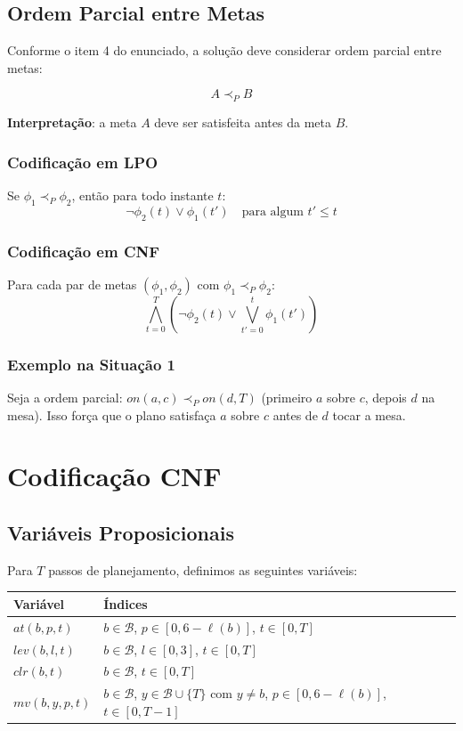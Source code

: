 \documentclass[12pt,a4paper]{article}
\begin{document}
\subsection{Ordem Parcial entre Metas}

Conforme o item 4 do enunciado, a solução deve considerar ordem parcial entre metas:

\[
A \prec_P B
\]

\textbf{Interpretação}: a meta $A$ deve ser satisfeita antes da meta $B$.

\subsubsection{Codificação em LPO}

Se $\phi_1 \prec_P \phi_2$, então para todo instante $t$:
\[
\neg \phi_2(t) \vee \phi_1(t') \quad \text{para algum } t' \le t
\]

\subsubsection{Codificação em CNF}

Para cada par de metas $(\phi_1, \phi_2)$ com $\phi_1 \prec_P \phi_2$:
\[
\bigwedge_{t=0}^{T} \left( \neg \phi_2(t) \vee \bigvee_{t'=0}^{t} \phi_1(t') \right)
\]

\subsubsection{Exemplo na Situação 1}

Seja a ordem parcial: $on(a,c) \prec_P on(d,T)$ (primeiro $a$ sobre $c$, depois $d$ na mesa). Isso força que o plano satisfaça $a$ sobre $c$ antes de $d$ tocar a mesa.

\section{Codificação CNF}
\label{sec:cnf}

\subsection{Variáveis Proposicionais}

Para $T$ passos de planejamento, definimos as seguintes variáveis:

\begin{longtable}{@{}p{3.5cm}p{9.5cm}@{}}
\toprule
\textbf{Variável} & \textbf{Índices} \\
\midrule
\endhead
$at(b,p,t)$ & $b \in \mathcal{B}$, $p \in [0, 6-\ell(b)]$, $t \in [0,T]$ \\
$lev(b,l,t)$ & $b \in \mathcal{B}$, $l \in [0,3]$, $t \in [0,T]$ \\
$clr(b,t)$ & $b \in \mathcal{B}$, $t \in [0,T]$ \\
$mv(b,y,p,t)$ & $b \in \mathcal{B}$, $y \in \mathcal{B} \cup \{T\}$ com $y \neq b$, $p \in [0,6-\ell(b)]$, $t \in [0,T-1]$ \\
\bottomrule
\end{longtable}
\end{document}
